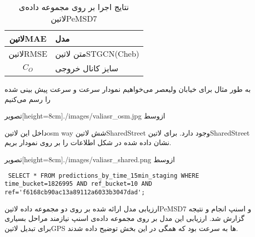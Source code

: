 \begin{table}[h]
  \centering
  \caption{نتایج اجرا بر روی مجموعه داده‌ی  لاتین{PeMSD7}}
  \begin{tabular}{|c|p{}|}
    \hline
     لاتین{MAE} & مدل \\
    \hline
     لاتین{RMSE} & متن لاتین{STGCN(Cheb)} \\
     $C_{O}$ & سایز کانال خروجی \\
    \hline
  \end{tabular}
  \label{tbl:distance}
\end{table}

به طور مثال برای خیابان ولیعصر می‌خواهیم نمودار سرعت و سرعت پیش بینی شده را رسم می‌کنیم

  ‌تصویر[height=8cm]{./images/valiasr_osm.jpg}
  ‌ازوسط

 داخل این  لاتین{osm way} شش  لاتین{SharedStreet} وجود دارد. برای  لاتین{SharedStreet} نشان داده شده در شکل اطلاعات را بر روی نمودار بریم.

  ‌تصویر[height=8cm]{./images/valiasr_shared.png}
  ‌ازوسط

 \begin{lstlisting}
 SELECT * FROM predictions_by_time_15min_staging WHERE time_bucket=1826995 AND ref_bucket=10 AND ref='f6168cb90ac13a89112a6033b3047dad';
 \end{lstlisting}

 ارزیابی مدل ارائه شده بر روی دو مجموعه داده ‌لاتین{PeMSD7} و اسنپ انجام و نتیجه گزارش شد. ارزیابی این مدل بر روی مجموعه داده‌ی اسنپ نیازمند مراحل بسیاری برای تبدیل ‌لاتین{GPS} ها به سرعت بود که همگی در این بخش توضیح داده شدند.
